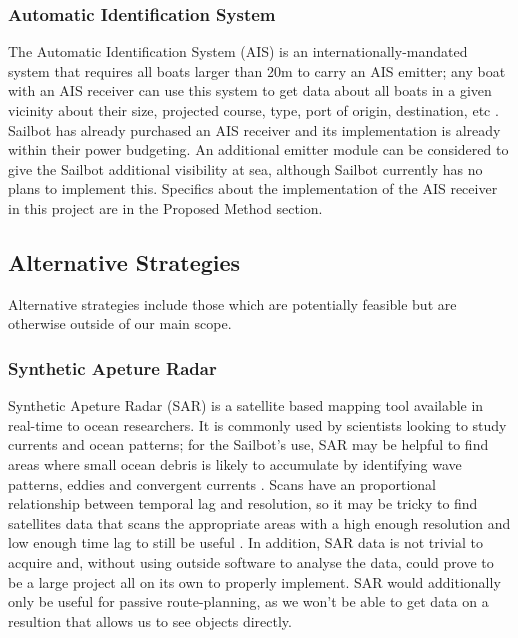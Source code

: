 \subsubsection{\label{sec:intro:technical-background:ais}Automatic Identification System}
The Automatic Identification System (AIS) is an internationally-mandated system that requires all boats larger than 20m to carry an AIS emitter; any boat with an AIS receiver can use this system to get data about all boats in a given vicinity about their size, projected course, type, port of origin, destination, etc  \cite{us-ais-requirements}. Sailbot has already purchased an AIS receiver and its implementation is already within their power budgeting. An additional emitter module can be considered to give the Sailbot additional visibility at sea, although Sailbot currently has no plans to implement this. Specifics about the implementation of the AIS receiver in this project are in the Proposed Method section.





\subsection{\label{sec:intro:alternatives}Alternative Strategies}
Alternative strategies include those which are potentially feasible but are otherwise outside of our main scope. 


\subsubsection{\label{sec:intro:alternatives:sar}Synthetic Apeture Radar}
Synthetic Apeture Radar (SAR) is a satellite based mapping tool available in real-time to ocean researchers. It is commonly used by scientists looking to study currents and ocean patterns; for the Sailbot's use, SAR may be helpful to find areas where small ocean debris is likely to accumulate by identifying wave patterns, eddies and convergent currents  \cite{SAR-manual}. Scans have an proportional relationship between temporal lag and resolution, so it may be tricky to find satellites data that scans the appropriate areas with a high enough resolution and low enough time lag to still be useful \cite{Mace}. In addition, SAR data is not trivial to acquire and, without using outside software to analyse the data, could prove to be a large project all on its own to properly implement. SAR would additionally only be useful for passive route-planning, as we won't be able to get data on a resultion that allows us to see objects directly.

